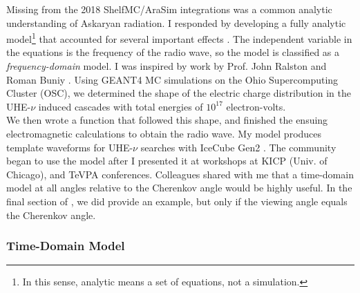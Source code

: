 \documentclass[../../../main.tex]{subfiles}
\begin{document}
Missing from the 2018 ShelfMC/AraSim integrations was a common analytic understanding of Askaryan radiation.  I responded by developing a fully analytic model\footnote{In this sense, analytic means a set of equations, not a simulation.} that accounted for several important effects \cite{10.1016/j.astropartphys.2017.03.008}.  The independent variable in the equations is the frequency of the radio wave, so the model is classified as a \textit{frequency-domain} model.  I was inspired by work by Prof. John Ralston and Roman Buniy \cite{10.1103/physrevd.65.016003}.  Using GEANT4 MC simulations on the Ohio Supercomputing Cluster (OSC), we determined the shape of the electric charge distribution in the UHE-$\nu$ induced cascades with total energies of $10^{17}$ electron-volts.
\\
\vspace{0.25cm}
We then wrote a function that followed this shape, and finished the ensuing electromagnetic calculations to obtain the radio wave.  My model produces template waveforms for UHE-$\nu$ searches with IceCube Gen2 \cite{10.1016/j.astropartphys.2017.03.008}.  The community began to use the model after I presented it at workshops at KICP (Univ. of Chicago), and TeVPA conferences.  Colleagues shared with me that a time-domain model at all angles relative to the Cherenkov angle would be highly useful.  In the final section of \cite{10.1016/j.astropartphys.2017.03.008}, we did provide an example, but only if the viewing angle equals the Cherenkov angle.

\subsubsection{Time-Domain Model}
\end{document}
